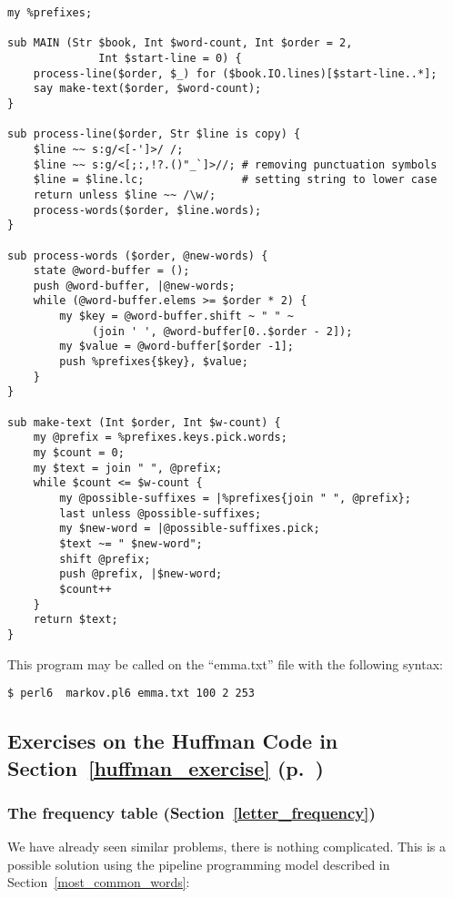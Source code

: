 \begin{verbatim}
my %prefixes;

sub MAIN (Str $book, Int $word-count, Int $order = 2, 
              Int $start-line = 0) {
    process-line($order, $_) for ($book.IO.lines)[$start-line..*]; 
    say make-text($order, $word-count);
}

sub process-line($order, Str $line is copy) {
    $line ~~ s:g/<[-']>/ /; 
    $line ~~ s:g/<[;:,!?.()"_`]>//; # removing punctuation symbols
    $line = $line.lc;               # setting string to lower case
    return unless $line ~~ /\w/;
    process-words($order, $line.words);
}

sub process-words ($order, @new-words) {
    state @word-buffer = ();
    push @word-buffer, |@new-words;
    while (@word-buffer.elems >= $order * 2) {
        my $key = @word-buffer.shift ~ " " ~ 
             (join ' ', @word-buffer[0..$order - 2]);
        my $value = @word-buffer[$order -1];
        push %prefixes{$key}, $value;
    }
}

sub make-text (Int $order, Int $w-count) {
    my @prefix = %prefixes.keys.pick.words;
    my $count = 0;
    my $text = join " ", @prefix;
    while $count <= $w-count {
        my @possible-suffixes = |%prefixes{join " ", @prefix};
        last unless @possible-suffixes;
        my $new-word = |@possible-suffixes.pick;
        $text ~= " $new-word";
        shift @prefix;
        push @prefix, |$new-word;
        $count++
    }
    return $text;
}     
\end{verbatim}

This program may be called on the ``emma.txt'' file with 
the following syntax:

\begin{verbatim}
$ perl6  markov.pl6 emma.txt 100 2 253
\end{verbatim}

\subsection{Exercises on the Huffman Code in Section~\ref{huffman_exercise} (p.~\pageref{huffman_exercise})}

\subsubsection{The frequency table (Section~\ref{letter_frequency})}
\label{sol_letter_frequency}

We have already seen similar problems, there is nothing complicated. 
This is a possible solution using the pipeline programming model 
described in Section~\ref{most_common_words}:

